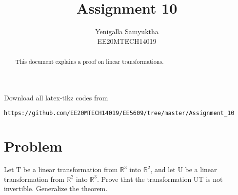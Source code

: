 \documentclass[journal,12pt,twocolumn]{IEEEtran}
\begin{document}
     \def\rightbox#1{\makebox[0in][r]{#1}}
     \def\centbox#1{\makebox[0in]{#1}}
     \def\topbox#1{\raisebox{-\baselineskip}[0in][0in]{#1}}
     \def\midbox#1{\raisebox{-0.5\baselineskip}[0in][0in]{#1}}
\vspace{3cm}
\title{Assignment 10}
\author{Yenigalla Samyuktha\\EE20MTECH14019}
\maketitle
\newpage
\bigskip
\renewcommand{\thefigure}{\theenumi}
\renewcommand{\thetable}{\theenumi}
\begin{abstract}
This document explains a proof on linear transformations.
\end{abstract}
Download all latex-tikz codes from 
%
\begin{lstlisting}
https://github.com/EE20MTECH14019/EE5609/tree/master/Assignment_10
\end{lstlisting}
%
\section{Problem}
Let T be a linear transformation from $\mathbb{R}^3$ into $\mathbb{R}^2$, and let U be a linear transformation from $\mathbb{R}^2$ into $\mathbb{R}^3$. Prove that the transformation UT is not invertible. Generalize the theorem.
\end{document}
